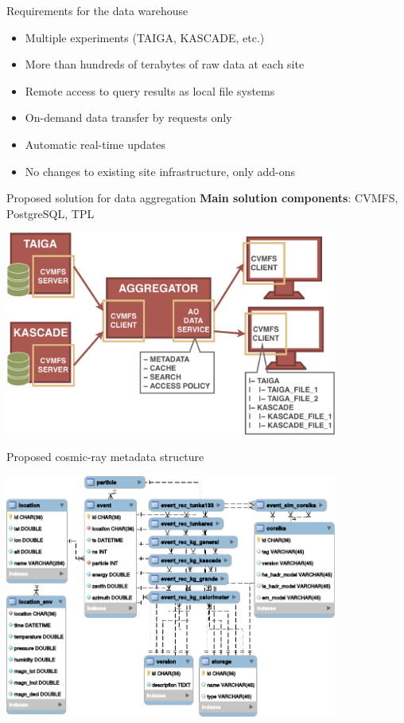 
\begin{frame}{Requirements for the data warehouse}
  \begin{itemize}
    \item Multiple experiments (TAIGA, KASCADE, etc.)
    \item More than hundreds of terabytes of raw data at each site
    \item Remote access to query results as local file systems
    \item  On-demand data transfer by requests only
    \item  Automatic real-time updates
    \item  No changes to existing site infrastructure, only add-ons
  \end{itemize}
\end{frame}

\begin{frame}{Proposed solution for data aggregation}
\textbf{Main solution components}: CVMFS, PostgreSQL, TPL
    \begin{center}
        \includegraphics[width=0.82\textwidth]{pics/agr.pdf}
    \end{center}
\end{frame}


\begin{frame}{Proposed cosmic-ray metadata structure}
    \vspace{-1.5em}
    \begin{center}
        \includegraphics[width=0.82\textwidth]{pics/metadata.pdf}
    \end{center}
\end{frame}


